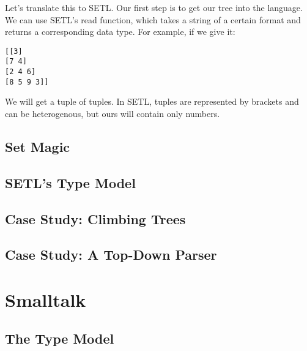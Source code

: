 \documentclass[11pt]{article}
\begin{document}
Let's translate this to SETL. Our first step is to get our tree into 
the language. We can use SETL's read function, which takes a string of a certain
format and returns a corresponding data type. For example, if we give it:

\begin{verbatim}
[[3]
[7 4]
[2 4 6]
[8 5 9 3]]
\end{verbatim}

We will get a tuple of tuples. In SETL, tuples are represented by brackets and
can be heterogenous, but ours will contain only numbers.


\subsection{Set Magic}


\subsection{SETL's Type Model}


\subsection{Case Study: Climbing Trees}


\subsection{Case Study: A Top-Down Parser}

\section{Smalltalk}
\subsection{The Type Model}
\end{document}
